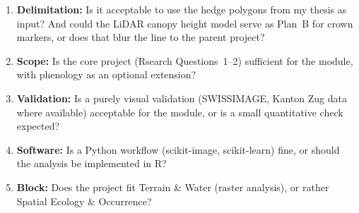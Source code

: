 \documentclass[10pt,a4paper]{article}
\begin{document}
\begin{enumerate}[topsep=2pt, itemsep=1pt, leftmargin=1.4em]

\item \textbf{Delimitation:} Is it acceptable to use the
hedge polygons from my thesis as input? And could the
LiDAR canopy height model serve as Plan~B for crown
markers, or does that blur the line to the parent
project?

\item \textbf{Scope:} Is the core project (Rsearch Questions~1--2)
sufficient for the module, with phenology as an
optional extension?

\item \textbf{Validation:} Is a purely visual
validation (SWISSIMAGE, Kanton Zug data where
available) acceptable for the module, or is a small
quantitative check expected?

\item \textbf{Software:} Is a Python workflow
(scikit-image, scikit-learn) fine, or should the
analysis be implemented in R?

\item \textbf{Block:} Does the project fit Terrain \&
Water (raster analysis), or rather Spatial Ecology \&
Occurrence?

\end{enumerate}
\end{document}
